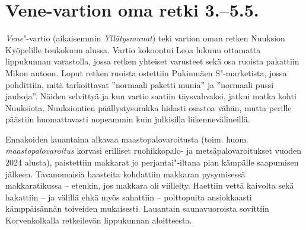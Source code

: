 
\section{Vene-vartion oma retki 3.–5.5.}



\begin{multicols}{2}

\noindent \textit{Vene}"-vartio (aikaisemmin \mbox{\textit{Yllätysmunat}}) teki vartion oman retken Nuuksion Kyöpelille toukokuun alussa. Vartio kokoontui Leoa lukuun ottamatta lippukunnan varastolla, jossa retken yhteiset varusteet sekä osa ruoista pakattiin Mikon autoon. Loput retken ruoista ostettiin Pukinmäen S"-marketista, jossa pohdittiin, mitä tarkoittavat ''normaali paketti munia'' ja ''normaali pussi jauhoja''. Näiden selvittyä ja kun vartio saatiin täysvahvaksi, jatkui matka kohti Nuuksiota. Nuuksiontien päällystysurakka hidasti osastoa vähän, mutta perille päästiin huomattavasti nopeammin kuin julkisilla liikennevälineillä.

Ennakoiden lauantaina alkavaa maastopalovaroitusta (toim. huom. \textit{maastopalovaroitus} korvasi erilliset ruohikkopalo- ja metsäpalovaroitukset vuoden 2024 alusta), paistettiin makkarat jo perjantai"-iltana pian kämpälle saapumisen jälkeen. Tavanomaisia haasteita kohdattiin makkaran pysymisessä makkaratikussa -- etenkin, jos makkara oli viillelty. Haettiin vettä kaivolta sekä hakattiin -- ja välillä ehkä myös sahattiin -- polttopuita ansiokkaasti kämppäisännän toiveiden mukaisesti. Lauantain saunavuoroista sovittiin Korvenkolkalla retkeilevän lippukunnan aloitteesta.


\end{multicols}
